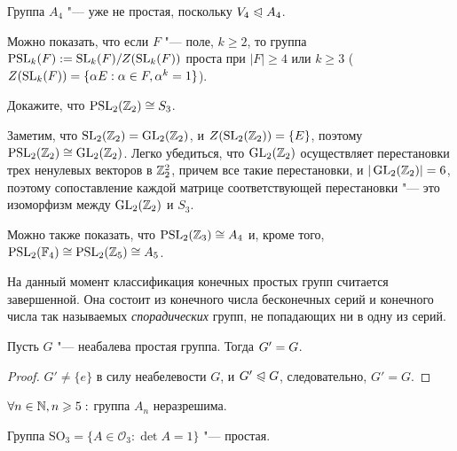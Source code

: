 \begin{note}
	Группа $A_4$ "--- уже не простая, поскольку $V_4 \trianglelefteqslant A_4$.
\end{note}

\begin{note}
	Можно показать, что если $F$ "--- поле, $k \ge 2$, то группа $\PSL_k(F) \hm{:=} \SL_k(F) / Z(\SL_k(F))$ проста при $|F| \ge 4$ или $k \ge 3$ ($Z(\operatorname{SL}_k(F)) = \{\alpha E: \alpha \in F, \alpha^k = 1\}$).
\end{note}

\begin{exercise}
	Докажите, что $\operatorname{PSL}_2(\mathbb{Z}_2) \cong S_3$.
\end{exercise}

\begin{solution}
	Заметим, что $\operatorname{SL}_2(\mathbb{Z}_2)  = \operatorname{GL}_2(\mathbb{Z}_2)$, и $Z(\operatorname{SL}_2(\mathbb{Z}_2)) = \{E\}$, поэтому $\PSL_2(\Z_2) \hm\cong \GL_2(\Z_2)$. Легко убедиться, что $\operatorname{GL}_2(\mathbb{Z}_2)$ осуществляет перестановки трех ненулевых векторов в $\mathbb{Z}_2^2$, причем все такие перестановки, и $|\operatorname{GL}_2(\mathbb{Z}_2)| = 6$, поэтому сопоставление каждой матрице соответствующей перестановки "--- это изоморфизм между $\operatorname{GL}_2(\mathbb{Z}_2)$ и $S_3$.
\end{solution}

\begin{note}
	Можно также показать, что $\operatorname{PSL}_2(\mathbb{Z}_3) \cong A_4$ и, кроме того, $\PSL_2(\mathbb{F}_4) \hm\cong \PSL_2(\Z_5) \cong A_5$.
\end{note}

\begin{note}
	На данный момент классификация конечных простых групп считается завершенной. Она состоит из конечного числа бесконечных серий и конечного числа так называемых \textit{спорадических} групп, не попадающих ни в одну из серий.
\end{note}

\begin{proposition}
	Пусть $G$ "--- неабалева простая группа. Тогда $G' \hm= G$.
\end{proposition}

\begin{proof}
	$G' \ne \{e\}$ в силу неабелевости $G$, и $G' \trianglelefteqslant G$, следовательно, $G' = G$.
\end{proof}

\begin{corollary}
	$\forall n \in \mathbb{N}, n \geqslant 5:$ группа $A_n$ неразрешима.
\end{corollary}

\begin{theorem}
	Группа $\mathrm{SO}_3 = \{A \in \mathcal{O}_3: \det{A} = 1\}$ "--- простая.
\end{theorem}

